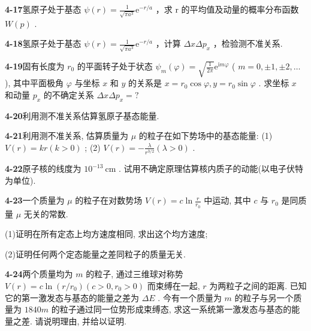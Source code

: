 \newpage
\vfill

\noindent
\textbf{4-17}\quad 氢原子处于基态 $\psi(r)=\frac{1}{\sqrt{\pi a^{3}}}\mathrm{e}^{-r/a}$ ，求 r 的平均值及动量的概率分布函数 $W(p)$ .

\vfill

\newpage
\vfill

\noindent
\textbf{4-18}\quad 氢原子处于基态 $\psi(r)=\frac{1}{\sqrt{\pi a^{3}}}\mathrm{e}^{-r/a}$ ，计算 $\Delta x\Delta p_{x}$ ，检验测不准关系.

\vfill

\newpage
\vfill

\noindent
\textbf{4-19}\quad 固有长度为 $r_0$ 的平面转子处于状态 $\psi_m(\varphi) = \sqrt{\frac{1}{2\pi}}\mathrm{e}^{\mathrm{i}m\varphi}$ ( $m = 0, \pm 1, \pm 2, \dots$ ), 其中平面极角 $\varphi$ 与坐标 $x$ 和 $y$ 的关系是 $x = r_0\cos \varphi, y = r_0\sin \varphi$ . 求坐标 $x$ 和动量 $p_x$ 的不确定关系 $\Delta x\Delta p_x = ?$

\vfill

\newpage
\vfill

\noindent
\textbf{4-20}\quad 利用测不准关系估算氢原子基态能量.

\vfill

\newpage
\vfill

\noindent
\textbf{4-21}\quad 利用测不准关系, 估算质量为 $\mu$ 的粒子在如下势场中的基态能量: (1) $V(r) = kr(k > 0)$ ; (2) $V(r) = -\frac{\lambda}{r^{3/2}} (\lambda > 0)$ .

\vfill

\newpage
\vfill

\noindent
\textbf{4-22}\quad 原子核的线度为 $10^{-13} \mathrm{~cm}$ . 试用不确定原理估算核内质子的动能(以电子伏特为单位).

\vfill

\newpage
\vfill

\noindent
\textbf{4-23}\quad 一个质量为 $\mu$ 的粒子在对数势场 $V(r) = c\ln \frac{r}{r_0}$ 中运动, 其中 $c$ 与 $r_0$ 是同质量 $\mu$ 无关的常数. 

(1)证明在所有定态上均方速度相同, 求出这个均方速度; 

(2)证明任何两个定态能量之差同粒子的质量无关.

\vfill

\newpage
\vfill

\noindent
\textbf{4-24}\quad 两个质量均为 $m$ 的粒子, 通过三维球对称势 $V(r) = c \ln (r / r_0) (c > 0, r_0 > 0)$ 而束缚在一起, $r$ 为两粒子之间的距离. 已知它的第一激发态与基态的能量之差为 $\Delta E$ . 今有一个质量为 $m$ 的粒子与另一个质量为 $1840m$ 的粒子通过同一位势形成束缚态, 求这一系统第一激发态与基态的能量之差. 请说明理由, 并给以证明.

